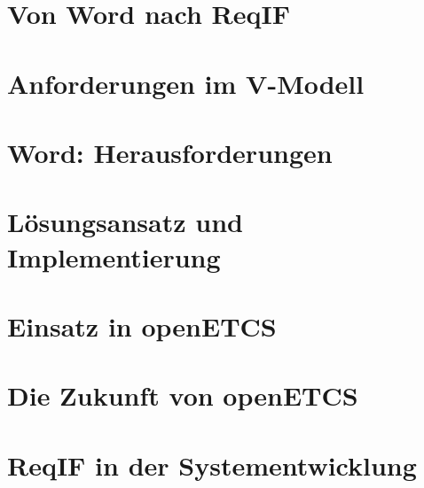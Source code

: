 \documentclass[twoside]{article}
\begin{document}
\begin{multicols}{2}
\section{Von Word nach ReqIF}

\section{Anforderungen im V-Modell}

\section{Word: Herausforderungen}

\section{Lösungsansatz und Implementierung}

\section{Einsatz in openETCS}

\section{Die Zukunft von openETCS}

\section{ReqIF in der Systementwicklung}


\end{multicols}
\end{document}
